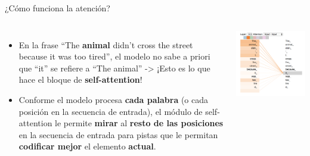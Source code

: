 \begin{frame}{¿Cómo funciona la atención?}

\begin{columns}
\begin{itemize}
    \item En la frase “The \textbf{animal} didn’t cross the street because it was too tired”, el modelo no sabe a priori que “it” se refiere a “The animal” -> ¡Esto es lo que hace el bloque de \textbf{self-attention}!
    \item Conforme el modelo procesa \textbf{cada palabra} (o cada posición en la secuencia de entrada), el módulo de self-attention le permite \textbf{mirar} al \textbf{resto de las posiciones} en la secuencia de entrada para pistas que le permitan \textbf{codificar mejor} el elemento \textbf{actual}.
\end{itemize}

\includegraphics[width=\textwidth]{Slides/figures/02_Metodos_Generativos/trans-att.png}

\end{columns}
\end{frame}



